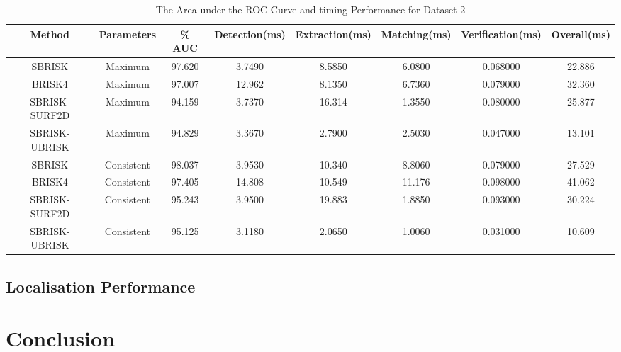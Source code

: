 \documentclass{article}
\begin{document}
\begin{table}
\caption{The Area under the ROC Curve and timing Performance for Dataset 2}
\footnotesize
\begin{tabular}{|c|c|c|c|c|c|c|c|}
\hline 
Method & Parameters & \% AUC & Detection(ms) & Extraction(ms) & Matching(ms) & Verification(ms) & Overall(ms)\tabularnewline
\hline 
\hline 
SBRISK & Maximum & 97.620 & 3.7490 & 8.5850 & 6.0800 & 0.068000 & 22.886\tabularnewline
\hline 
BRISK4 & Maximum & 97.007 & 12.962 & 8.1350 & 6.7360 & 0.079000 & 32.360\tabularnewline
\hline 
SBRISK-SURF2D & Maximum & 94.159 & 3.7370 & 16.314 & 1.3550 & 0.080000 & 25.877\tabularnewline
\hline 
SBRISK-UBRISK & Maximum & 94.829 & 3.3670 & 2.7900 & 2.5030 & 0.047000 & 13.101\tabularnewline
\hline 
SBRISK & Consistent & 98.037 & 3.9530 & 10.340 & 8.8060 & 0.079000 & 27.529\tabularnewline
\hline 
BRISK4 & Consistent & 97.405 & 14.808 & 10.549 & 11.176 & 0.098000 & 41.062\tabularnewline
\hline 
SBRISK-SURF2D & Consistent & 95.243 & 3.9500 & 19.883 & 1.8850 & 0.093000 & 30.224\tabularnewline
\hline 
SBRISK-UBRISK & Consistent & 95.125 & 3.1180 & 2.0650 & 1.0060 & 0.031000 & 10.609\tabularnewline
\hline 
\end{tabular}
\label{tab:rocTimingAdditional}
\end{table}




\subsection{Localisation Performance}
\label{sec:localisationPerformance}







\section{Conclusion}
\label{sec:conclusion}



%
%
 
\end{document}
